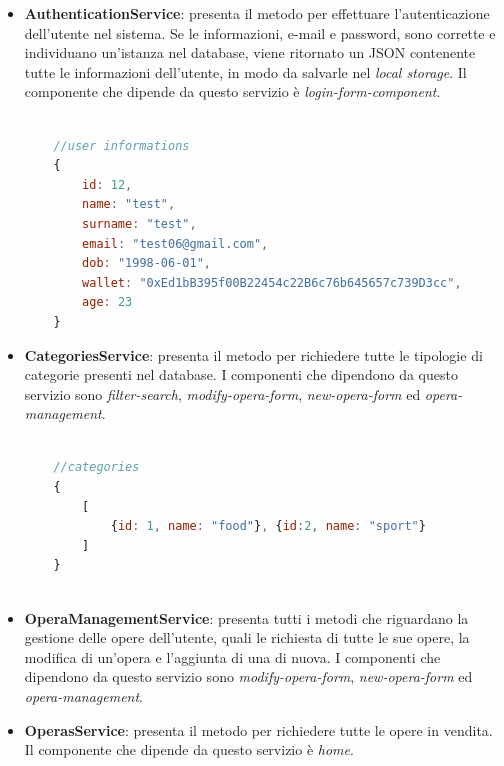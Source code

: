 \documentclass[11pt]{article}
\begin{document}
\begin{itemize}
    \item \textbf{AuthenticationService}: presenta il metodo per effettuare l'autenticazione dell'utente nel sistema. Se le informazioni, e-mail e password, sono corrette e individuano un'istanza nel database, viene ritornato un JSON contenente tutte le informazioni dell'utente, in modo da salvarle nel \textit{local storage}. Il componente che dipende da questo servizio è \textit{login-form-component}.
    
    \begin{lstlisting}[language=JavaScript, numbers=none, caption=Esempio di JSON ritornato dal servizio di autenticazione]
    
    //user informations
    {
        id: 12,
        name: "test",
        surname: "test",
        email: "test06@gmail.com",
        dob: "1998-06-01",
        wallet: "0xEd1bB395f00B22454c22B6c76b645657c739D3cc",
        age: 23
    }
    \end{lstlisting}
    
    \item \textbf{CategoriesService}: presenta il metodo per richiedere tutte le tipologie di categorie presenti nel database. I componenti che dipendono da questo servizio sono \textit{filter-search}, \textit{modify-opera-form}, \textit{new-opera-form} ed \textit{opera-management}.
    
    \begin{lstlisting}[language=JavaScript,numbers=none, caption=Esempio di JSON ritornato dal servizio di richiesta delle categorie]
    
    //categories
    {
        [
            {id: 1, name: "food"}, {id:2, name: "sport"}
        ]
    }
    
    \end{lstlisting}
    
    \item \textbf{OperaManagementService}: presenta tutti i metodi che riguardano la gestione delle opere dell'utente, quali le richiesta di tutte le sue opere, la modifica di un'opera e l'aggiunta di una di nuova. I componenti che dipendono da questo servizio sono \textit{modify-opera-form}, \textit{new-opera-form} ed \textit{opera-management}.
    
    \newpage
    
    \item \textbf{OperasService}: presenta il metodo per richiedere tutte le opere in vendita. Il componente che dipende da questo servizio è \textit{home}.
    

\end{itemize}
\end{document}

